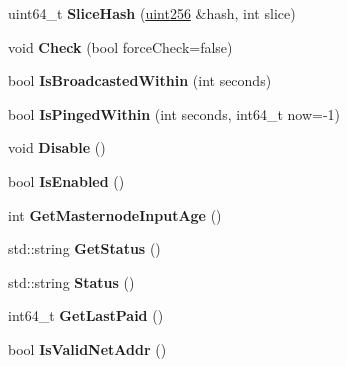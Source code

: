 \begin{DoxyCompactItemize}
\item 
\mbox{\label{class_c_masternode_a2bdfe71525650c59ca2a94f5e91aca0c}} 
uint64\+\_\+t {\bfseries Slice\+Hash} (\mbox{\hyperlink{classuint256}{uint256}} \&hash, int slice)
\item 
\mbox{\label{class_c_masternode_aa5892c0b8ec6d2a05cbb081cb1e0aa3c}} 
void {\bfseries Check} (bool force\+Check=false)
\item 
\mbox{\label{class_c_masternode_a7086beb9d837f33525922c1f2e505a35}} 
bool {\bfseries Is\+Broadcasted\+Within} (int seconds)
\item 
\mbox{\label{class_c_masternode_ab4d54c22f0e31b0d2ee111c6b11d7e72}} 
bool {\bfseries Is\+Pinged\+Within} (int seconds, int64\+\_\+t now=-\/1)
\item 
\mbox{\label{class_c_masternode_a40bb75d346e39972c38321d3a62db5e0}} 
void {\bfseries Disable} ()
\item 
\mbox{\label{class_c_masternode_a08782379f6ba10e9087b39f0cef19bce}} 
bool {\bfseries Is\+Enabled} ()
\item 
\mbox{\label{class_c_masternode_abc43d7a984d888b6dbc59a667a2fbc17}} 
int {\bfseries Get\+Masternode\+Input\+Age} ()
\item 
\mbox{\label{class_c_masternode_a229c65e2db85fe13a7ffb9bfa7ab2495}} 
std\+::string {\bfseries Get\+Status} ()
\item 
\mbox{\label{class_c_masternode_a9c1beafb61c235684d66cb2ee73c2642}} 
std\+::string {\bfseries Status} ()
\item 
\mbox{\label{class_c_masternode_a303e8288ffe803c68d8cc31224a35cdd}} 
int64\+\_\+t {\bfseries Get\+Last\+Paid} ()
\item 
\mbox{\label{class_c_masternode_a70f120b4964fdd802a6975bfb9017a23}} 
bool {\bfseries Is\+Valid\+Net\+Addr} ()
\end{DoxyCompactItemize}
